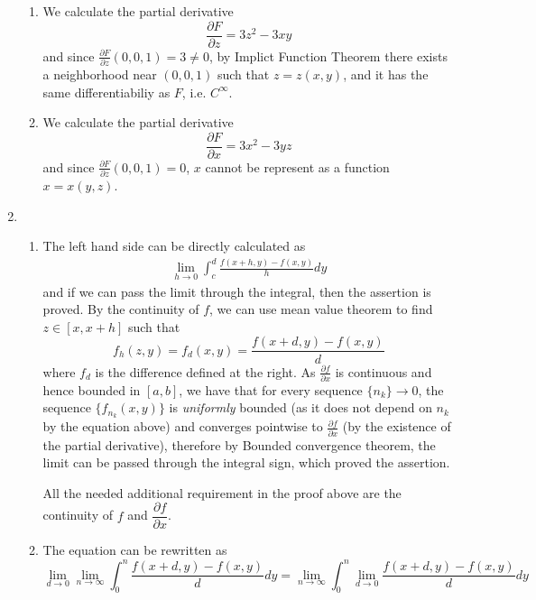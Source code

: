 \begin{enumerate}
        \begin{enumerate}
            \item We calculate the partial derivative
            \[
            \frac{\partial F}{\partial z}  = 3z^2 - 3xy	
            \]
            and since $\frac{\partial F}{\partial z} (0,0,1) = 3 \neq 0$, by Implict Function Theorem there exists a neighborhood near $(0,0,1)$ such that $z = z(x,y)$, and it has the same differentiabiliy as $F$, i.e. $C^\infty$.
            \item We calculate the partial derivative
            \[
            \frac{\partial F}{\partial x}  = 3x^2 - 3yz	
            \]
            and since $\frac{\partial F}{\partial z} (0,0,1) = 0$, $x$ cannot be represent as a function $x=x(y,z)$. 
        \end{enumerate}
        \item
        \begin{enumerate}
            \item 
            The left hand side can be directly calculated as
            \begin{align*}
                \lim_{h \to 0} \int_c^d \frac{f(x+h, y) - f(x,y) }{h} dy
            \end{align*}
            and if we can pass the limit through the integral, then the assertion is proved. By the continuity of $f$, we can use mean value theorem to find $z \in [x,x+h]$ such that 
            \[
                f_h(z,y) = f_d(x,y) =  \frac{f(x+d, y) - f(x,y)}{d}
            \]
            where $f_d$ is the difference defined at the right. As $\frac{\partial f}{\partial x}$ is continuous and hence bounded in $[a,b]$, we have that for every sequence $\{n_k\} \to 0$, the sequence $\{f_{n_k}(x,y)\}$ is \textit{uniformly} bounded (as it does not depend on $n_k$ by the equation above) and converges pointwise to $\frac{\partial f}{\partial x}$ (by the existence of the partial derivative), therefore by Bounded convergence theorem, the limit can be passed through the integral sign, which proved the assertion.
    
            All the needed additional requirement in the proof above are the continuity of $f$ and $\dfrac{\partial f}{\partial x}$.
            \item The equation can be rewritten as 
            \[
            \lim_{d \to 0} \lim_{n \to \infty} \int_0^n \frac{f(x+d, y) - f(x,y)}{d} dy = \lim_{n \to \infty} \int_0^n \lim_{d \to 0} \frac{f(x+d, y) - f(x,y)}{d} dy
            \]
        \end{enumerate}
    \end{enumerate}